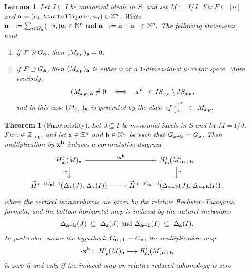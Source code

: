 \documentclass[10pt,a4paper]{amsart}
\newtheorem{theorem}{Theorem}
\newtheorem{lemma}{Lemma}
\newcommand{\NN}{{\mathbb N}}
\newcommand{\ZZ}{{\mathbb Z}}
\def\a{{\bold a}}
\def\b{{\bold b}}
\def\e{{\bold e}}
\def\x{{\bold x}}
\begin{document}
\begin{lemma}\label{lem:gradedpiece-dim1}
	Let $J\subseteq I$ be monomial ideals in $S$, and set $M:=I/J$.
	Fix $F\subseteq[n]$ and $\a = (a_1, \dots, a_n) \in\ZZ^n$. Write $\a^-:=\sum_{i\in G_\a}(-a_i)\e_i\in\NN^n \text{ and } \a^+:=\a+\a^-\in\NN^n.$
	The following statements hold:
	\begin{enumerate}
		\item[(1)] If $F\not\supseteq G_\a$, then $(M_{x_F})_\a=0$.
		\item[(2)] If $F\supseteq G_\a$, then $(M_{x_F})_\a$ is either $0$ or a $1$-dimensional
		$k$-vector space. More precisely,
		\[
		(M_{x_F})_\a\neq 0
		\quad\Longleftrightarrow\quad
		x^{\a^+}\in I S_{x_F}\setminus J S_{x_F},
		\]
		and in this case $(M_{x_F})_\a$ is generated by the class of $\frac{x^{\a^+}}{x^{\a^-}}\ \in\ M_{x_F}.$
	\end{enumerate}
\end{lemma}

\begin{theorem}[Functoriality]\label{MainLem}
	Let $J\subseteq I$ be monomial ideals in $S$ and let $M = I/J$.
	Fix $i\in\mathbb Z_{\ge 0}$, and let $\a\in\mathbb Z^n$ and $\b\in\mathbb N^n$ be such that $G_{\a+\b} = G_\a$.
	Then multiplication by $\x^\b$ induces a commutative diagram
	\[
	\begin{tikzcd}
		H^i_{\mathfrak m}(M)_\a
		\arrow[r,"{\cdot \x^\b}"]
		\arrow[d,"\cong"']
		&
		H^i_{\mathfrak m}(M)_{\a+\b}
		\arrow[d,"\cong"]
		\\
		\widetilde H^{\,i-|G_\a|-1}\!
		\big(
		\Delta_\a(J),\,\Delta_\a(I)
		\big)
		\arrow[r]
		&
		\widetilde H^{\,i-|G_\a|-1}\!
		\big(
		\Delta_{\a+\b}(J),\,\Delta_{\a+\b}(I)
		\big),
	\end{tikzcd}
	\]
	where the vertical isomorphisms are given by the relative Hochster--Takayama
	formula, and the bottom horizontal map is induced by the natural inclusions
	\[
	\Delta_{\a+\b}(J)\ \subseteq\ \Delta_\a(J)
	\text{ and }
	\Delta_{\a+\b}(I)\ \subseteq\ \Delta_\a(I).
	\]
	In particular, under the hypothesis $G_{\a+\b}=G_\a$, the multiplication map
	\[
	\cdot \x^\b:\ H^i_{\mathfrak m}(M)_\a \longrightarrow H^i_{\mathfrak m}(M)_{\a+\b}
	\]
	is zero if and only if the induced map on relative reduced cohomology is zero.
\end{theorem}
\end{document}
